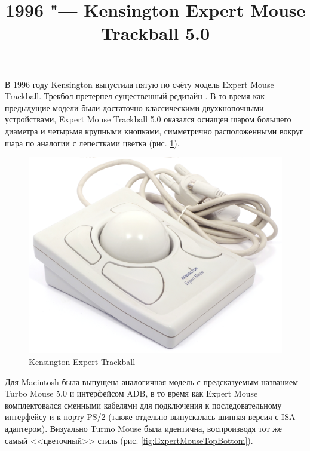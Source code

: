 \documentclass[11pt, a4paper]{article}
\begin{document}
\title{1996 "--- Kensington Expert Mouse Trackball 5.0}
\date{}
\maketitle

В 1996 году Kensington выпустила пятую по счёту модель Expert Mouse Trackball. Трекбол претерпел существенный редизайн \cite{KensingtonPC}. В то время как предыдущие модели были достаточно классическими двухкнопочными устройствами, Expert Mouse Trackball 5.0 оказался оснащен шаром большего диаметра и четырьмя крупными кнопками, симметрично расположенными вокруг шара по аналогии с лепестками цветка (рис. \ref{fig:ExpertMousePic}).

\begin{figure}[h]
    \centering
    \includegraphics[scale=0.4]{1996_kensington_expert_trackball_5/pic_60.jpg}
    \caption{Kensington Expert Trackball}
    \label{fig:ExpertMousePic}
\end{figure}

Для Macintosh была выпущена аналогичная модель с предсказуемым названием Turbo Mouse 5.0 \cite{KensingtonMac} и интерфейсом ADB, в то время как Expert Mouse комплектовался сменными кабелями для подключения к последовательному интерфейсу и к порту PS/2 (также отдельно выпускалась шинная версия с ISA-адаптером). Визуально Turmo Mouse была идентична, воспроизводя тот же самый <<цветочный>> стиль (рис. \ref{fig:ExpertMouseTopBottom}).
\end{document}
